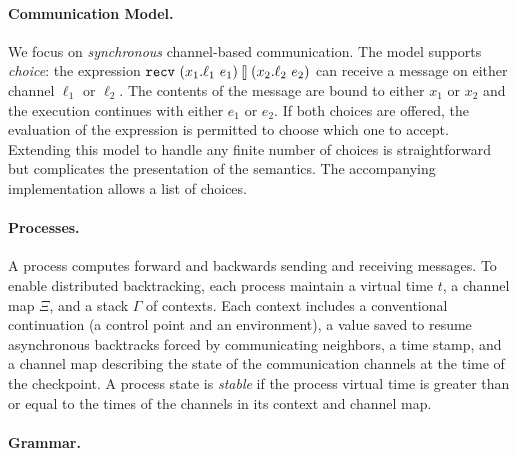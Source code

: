 \documentclass{article}
\begin{document}
\paragraph*{Communication Model.} We focus on \emph{synchronous}
channel-based communication. The model supports \emph{choice}: the expression
$\recv{x_1}{\ell_1}{x_2}{\ell_2}{e_1}{e_2}$ can receive a message on either
channel $\ell_1$ or $\ell_2$. The contents of the message are bound to either
$x_1$ or $x_2$ and the execution continues with either $e_1$ or $e_2$. If
both choices are offered, the evaluation of the expression is permitted to
choose which one to accept. Extending this model to handle any finite number
of choices is straightforward but complicates the presentation of the
semantics. The accompanying implementation allows a list of choices.

\paragraph*{Processes.} A process computes forward and backwards sending and
receiving messages. To enable distributed backtracking, each process maintain
a virtual time $t$, a channel map $\Xi$, and a stack $\Gamma$ of
contexts. Each context includes a conventional continuation (a control point
and an environment), a value saved to resume asynchronous backtracks forced
by communicating neighbors, a time stamp, and a channel map describing the
state of the communication channels at the time of the checkpoint. A process
state is \emph{stable} if the process virtual time is greater than or equal
to the times of the channels in its context and channel map.

\paragraph*{Grammar.}
\end{document}
